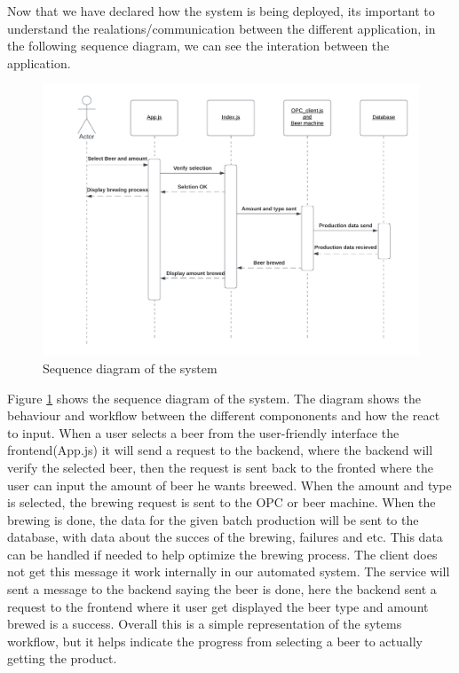 
Now that we have declared how the system is being deployed, its important to understand the realations/communication between the different application, in the following sequence diagram, we can see the interation between the application.

\begin{center}
    \centering
    \begin{figure}[H]
        \includegraphics[width=1\textwidth]{img/SQdiagram_implementation.png}
        \caption{Sequence diagram of the system}
        \label{fig:SQdiagram_implementation}
    \end{figure}
\end{center}

Figure \ref{fig:SQdiagram_implementation} shows the sequence diagram of the system. The diagram shows the behaviour and workflow between the different compononents and how the react to input. When a user selects a beer from the user-friendly interface the frontend(App.js) it will send a request to the backend, where the backend will verify the selected beer, then the request is sent back to the fronted where the user can input the amount of beer he wants breewed. When the amount and type is selected, the brewing request is sent to the OPC or beer machine. 
When the brewing is done, the data for the given batch production will be sent to the database, with data about the succes of the brewing, failures and etc. This data can be handled if needed to help optimize the brewing process. The client does not get this message it work internally in our automated system. The service will sent a message to the backend saying the beer is done, here the backend sent a request to the frontend where it user get displayed the beer type and amount brewed is a success.
Overall this is a simple representation of the sytems workflow, but it helps indicate the progress from selecting a beer to actually getting the product.

